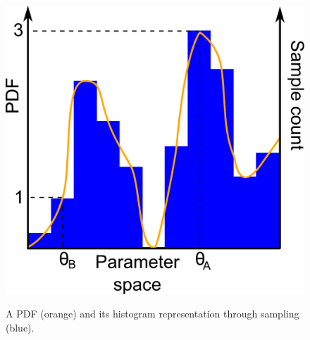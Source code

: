 \documentclass[11pt,fullpage]{book}
\begin{document}
\begin{figure}
\centering
\scalebox{0.3} 
{\includegraphics{MCMC_ideaHistogram.pdf}}
\caption{A PDF (orange) and its histogram representation through sampling (blue).}\label{fig:MCMC_ideaHistogram}
\end{figure}
\end{document}
